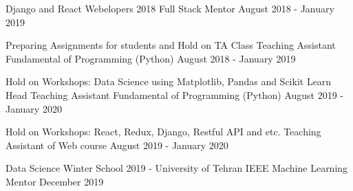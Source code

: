 \begin{cventries}


\cventry
{Django and React}
{Webelopers 2018 Full Stack Mentor}
{August 2018 - January 2019}
{}
{}

\cventry
{Preparing Assignments for students and Hold on TA Class}
{Teaching Assistant Fundamental of Programming (Python) }
{August 2018 - January 2019}
{}
{}

\cventry
{Hold on Workshops: Data Science using Matplotlib, Pandas and Scikit Learn}
{Head Teaching Assistant Fundamental of Programming (Python)}
{August 2019 - January 2020}
{}
{}

\cventry
{Hold on Workshops: React, Redux, Django, Restful API and etc.}
{Teaching Assistant of Web course}
{August 2019 - January 2020}
{}
{}

\cventry
{Data Science Winter School 2019 - University of Tehran}
{IEEE Machine Learning Mentor}
{December 2019}
{}
{}	
	

	
	

\end{cventries}
